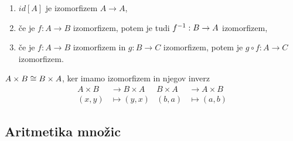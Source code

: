 \begin{dokaz}
  \begin{enumerate}
     \item $id[A]$ je izomorfizem $A \to A$,
     \item če je $f : A \to B$ izomorfizem, potem je tudi ${f}^{-1} : B \to A$ izomorfizem,
     \item če je $f : A \to B$ izomorfizem in $g : B \to C$ izomorfizem, potem je $g \circ f : A \to C$ izomorfizem.
  \end{enumerate}
\end{dokaz}

\begin{primer}
  $A \times B \cong B \times A$, ker imamo izomorfizem in njegov inverz
  \begin{align*}
    A \times B  &\to  B \times A      &    B \times A  &\to  A \times B \\
    (x, y) &\mapsto  (y, x)           &    (b, a) &\mapsto  (a, b)
  \end{align*}
\end{primer}

\subsection{Aritmetika množic}

